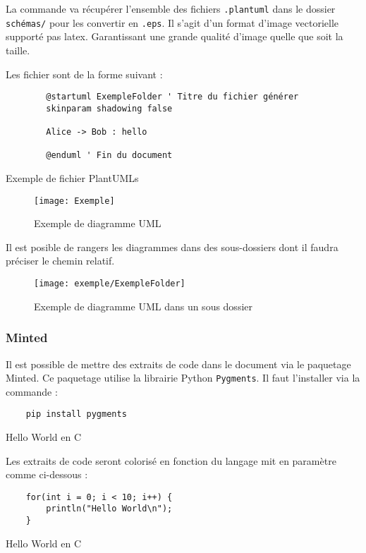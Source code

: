 La commande va récupérer l'ensemble des fichiers \verb=.plantuml=
dans le dossier \verb=schémas/= pour les convertir en \verb=.eps=.
Il s'agit d'un format d'image vectorielle supporté pas \gls{latex}.
Garantissant une grande qualité d'image quelle que soit la taille.

Les fichier sont de la forme suivant :
\begin{code}
    \begin{verbatim}
        @startuml ExempleFolder ' Titre du fichier générer
        skinparam shadowing false

        Alice -> Bob : hello

        @enduml ' Fin du document
    \end{verbatim}
    \caption{Exemple de fichier PlantUMLs}
\end{code}

\begin{figure}[H]
    \centering
    \texttt{[image: Exemple]}
    \caption{Exemple de diagramme UML}
\end{figure}

Il est posible de rangers les diagrammes dans des sous-dossiers dont il faudra préciser le chemin relatif.
\begin{figure}[H]
    \centering
    \texttt{[image: exemple/ExempleFolder]}
    \caption{Exemple de diagramme UML dans un sous dossier }
\end{figure}

\subsubsection{Minted}
Il est possible de mettre des extraits de code dans le document via le paquetage Minted.
Ce paquetage utilise la librairie Python \verb=Pygments=. Il faut l'installer via la commande :
\begin{code}
    \begin{verbatim}
    pip install pygments
\end{verbatim}
    \caption{Hello World en C}
\end{code}

Les extraits de code seront colorisé en fonction du langage mit en paramètre comme ci-dessous :

\begin{code}
    \begin{verbatim}
    for(int i = 0; i < 10; i++) {
        println("Hello World\n");
    }
\end{verbatim}
    \caption{Hello World en C}
\end{code}

